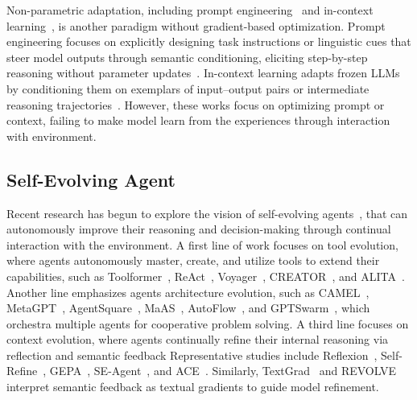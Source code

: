Non-parametric adaptation, including prompt engineering~\cite{sahoo2024systematic} and in-context learning~\cite{dong2022survey}, is another paradigm without gradient-based optimization.
Prompt engineering focuses on explicitly designing task instructions or linguistic cues that steer model outputs through semantic conditioning, eliciting step-by-step reasoning without parameter updates~\cite{kojima2022large,reynolds2021prompt,wang2022self,yao2023tree,besta2024graph,sahoo2024systematic}.
In-context learning adapts frozen LLMs by conditioning them on exemplars of input–output pairs or intermediate reasoning trajectories~\cite{brown2020language,wei2022chain,dong2022survey}.
However, these works focus on optimizing prompt or context, failing to make model learn from the experiences through interaction with environment.

\subsection{Self-Evolving Agent}
Recent research has begun to explore the vision of self-evolving agents~\cite{gao2025survey,fang2025comprehensive}, that can autonomously improve their reasoning and decision-making through continual interaction with the environment.
A first line of work focuses on tool evolution, where agents autonomously master, create, and utilize tools to extend their capabilities, such as Toolformer~\cite{schick2023toolformer}, ReAct~\cite{yao2022react}, Voyager~\cite{wang2023voyager}, CREATOR~\cite{qian2023creator}, and ALITA~\cite{qiu2025alita}.
Another line emphasizes agents architecture evolution, such as CAMEL~\cite{li2023camel}, MetaGPT~\cite{hong2023metagpt}, AgentSquare~\cite{shang2024agentsquare}, MaAS~\cite{zhang2025multi}, AutoFlow~\cite{li2024autoflow}, and GPTSwarm~\cite{zhuge2024gptswarm}, which orchestra multiple agents for cooperative problem solving.
A third line focuses on context evolution, where agents continually refine their internal reasoning via reflection and semantic feedback
Representative studies include Reflexion~\cite{shinn2023reflexion}, Self-Refine~\cite{madaan2023self}, GEPA~\cite{agrawal2025gepa}, SE-Agent~\cite{lin2025se}, and ACE~\cite{zhang2025agentic}.
Similarly, TextGrad~\cite{yuksekgonul2024textgrad} and REVOLVE~\cite{zhang2024revolve} interpret semantic feedback as textual gradients to guide model refinement.

